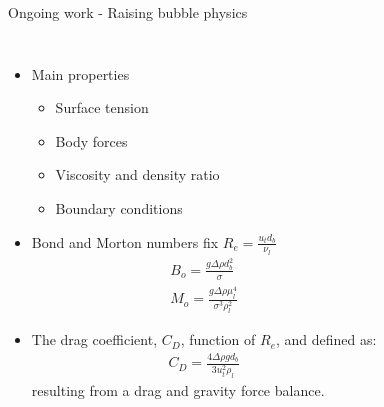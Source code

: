 \documentclass[8pt]{beamer}
\begin{document}
	\begin{frame}{Ongoing work - Raising bubble physics}
		
		\begin{columns}[T]
			
			
			\begin{itemize}
				\item Main properties
				\begin{itemize}
					\item Surface tension
					\item Body forces
					\item Viscosity and density ratio
					\item Boundary conditions
				\end{itemize}
				
				\item Bond and Morton numbers fix $R_e = \frac{u_t d_b}{\nu_l}$
				\begin{equation*}
					\begin{split}
						B_o = \frac{g \Delta \rho d_b^2}{\sigma}\\
						M_o = \frac{g \Delta \rho \mu_l^4}{\sigma^3 
							\rho_l^2}
					\end{split}
				\end{equation*}
				
				\item The drag coefficient, $C_D$, function of $R_e$, and defined as: 
				\begin{equation*}
					\begin{split}
						C_D = \frac{4 \Delta \rho g d_b}{3 u_t^2 \rho_l}
					\end{split}
				\end{equation*}
				resulting from a drag and gravity force balance. 
			\end{itemize}
			

\end{columns}
\end{frame}
\end{document}
